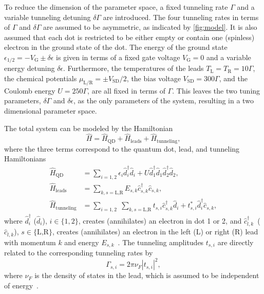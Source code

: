 \documentclass[../main.tex]{subfiles}
\begin{document}
To reduce the dimension of the parameter space, a fixed tunneling rate $\Gamma$ and a variable tunneling detuning $\delta\Gamma$ are introduced. The four tunneling rates in terms of $\Gamma$ and $\delta\Gamma$ are assumed to be asymmetric, as indicated by \cref{fig:model}. It is also assumed that each dot is restricted to be either empty or contain one (spinless) electron in the ground state of the dot. The energy of the ground state $\epsilon_{1/2} = -V_\text{G} \pm \delta\epsilon$ is given in terms of a fixed gate voltage $V_\text{G}=0$ and a variable energy detuning $\delta\epsilon$.  Furthermore, the temperatures of the leads $T_\text{L}=T_\text{R}=10\Gamma$, the chemical potentials $\mu_\text{L/R} = \pm V_\text{SD}/2$, the bias voltage $V_\text{SD} = 300\Gamma$, and the Coulomb energy $U = 250\Gamma$, are all fixed in terms of $\Gamma$. This leaves the two tuning parameters, $\delta\Gamma$ and $\delta\epsilon$, as the only parameters of the system, resulting in a two dimensional parameter space. 

The total system can be modeled by the Hamiltonian
\begin{equation}
    \hat H = \hat H_\text{QD} + \hat H_\text{leads} + \hat H_\text{tunneling},
\end{equation}
where the three terms correspond to the quantum dot, lead, and tunneling Hamiltonians
\begin{equation}
    \begin{split}
        \hat H_\text{QD} &= \sum_{i=1,2} \epsilon_i \hat d_i^\dag \hat d_i  + U\hat d_1^\dag \hat d_1 \hat d_2^\dag \hat d_2, \\
        \hat H_\text{leads} &= \sum_{k,s=\text{L,R}} E_{s, k} \hat c_{s,k}^\dag \hat c_{s,k}, \\
        \hat H_\text{tunneling} &= \sum_{i=1,2} \; \sum_{k,s=\text{L,R}} t_{s,i} \hat c_{s,k}^\dag \hat d_i + t_{s,i}^* \hat d_i^\dag \hat c_{s,k},
    \end{split}
\end{equation}
where $\hat d_i^\dag$ ($\hat d_i$), $i\in\{1,2\}$, creates (annihilates) an electron in dot 1 or 2, and $\hat c_{l,k}^\dag$~($\hat c_{l,k}$), $s\in\{\text{L,R}\}$, creates (annihilates) an electron in the left (L) or right (R) lead with momentum $k$ and energy $E_{s,k}$~\cite{doubledot}. The tunneling amplitudes $t_{s,i}$ are directly related to the corresponding tunneling rates by 
\begin{equation}
    \Gamma_{s,i} = 2\pi\nu_F|t_{s,i}|^2,
\end{equation}
where $\nu_F$ is the density of states in the lead, which is assumed to be independent of energy~\cite{perlind}.
\end{document}
